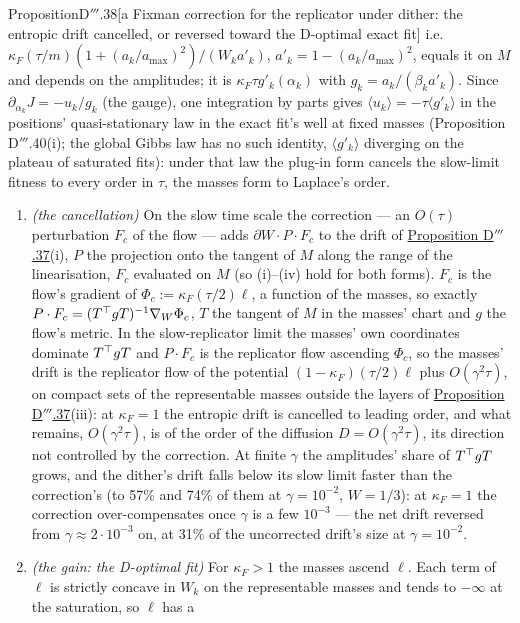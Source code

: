 \begin{thm}{Proposition}{D$'''$.38}[a Fixman correction for the replicator under dither: the entropic drift cancelled,
or reversed toward the D-optimal exact fit]
i.e.\ $\kappa_F(\tau/m)(1 + (a_k/a_{\max})^2)/(W_ka'_k)$, $a'_k = 1 - (a_k/a_{\max})^2$, equals it on $M$ and depends on
the amplitudes; it is $\kappa_F\tau g'_k(\alpha_k)$ with $g_k = a_k/(\beta_ka'_k)$. Since
$\partial_{\alpha_k}J = -u_k/g_k$ (the gauge), one integration by parts gives
$\langle u_k\rangle = -\tau\langle g'_k\rangle$ in the positions' quasi-stationary law in the exact fit's well at fixed
masses (Proposition D$'''$.40(i); the global Gibbs law has no such identity, $\langle g'_k\rangle$ diverging on the
plateau of saturated fits): under that law the plug-in form cancels the slow-limit fitness to every order in $\tau$,
the masses form to Laplace's order.
\begin{enumerate}[label=\textup{(\roman*)}]
  \item \emph{(the cancellation)} On the slow time scale the correction --- an $O(\tau)$ perturbation $F_c$ of the
    flow --- adds $\partial W\cdot P\cdot F_c$ to the drift of \hyperref[res:thmDppp:37]{Proposition D$'''$.37}(i),
    $P$ the projection onto the tangent of $M$ along the range of the linearisation, $F_c$ evaluated on $M$ (so
    (i)--(iv) hold for both forms). $F_c$ is the flow's gradient of $\Phi_c := \kappa_F(\tau/2)\ell$, a function of the
    masses, so exactly $P\cdot F_c = (T^\top gT)^{-1}\nabla_W\Phi_c$, $T$ the tangent of $M$ in the masses' chart and $g$
    the flow's metric. In the slow-replicator limit the masses' own coordinates dominate $T^\top gT$ and $P\cdot F_c$ is
    the replicator flow ascending $\Phi_c$, so the masses' drift is the replicator flow of the potential
    $(1 - \kappa_F)(\tau/2)\ell$ plus $O(\gamma^2\tau)$, on compact sets of the representable masses outside the layers
    of \hyperref[res:thmDppp:37]{Proposition D$'''$.37}(iii): at $\kappa_F = 1$ the entropic drift is cancelled to
    leading order, and what remains, $O(\gamma^2\tau)$, is of the order of the diffusion $D = O(\gamma^2\tau)$, its
    direction not controlled by the correction. At finite $\gamma$ the amplitudes' share of $T^\top gT$ grows, and the
    dither's drift falls below its slow limit faster than the correction's (to 57\% and 74\% of them at
    $\gamma = 10^{-2}$, $W = 1/3$): at $\kappa_F = 1$ the correction over-compensates once $\gamma$ is a few
    $10^{-3}$ --- the net drift reversed from $\gamma\approx2\cdot10^{-3}$ on, at 31\% of the uncorrected drift's size
    at $\gamma = 10^{-2}$.
  \item \emph{(the gain: the D-optimal fit)} For $\kappa_F > 1$ the masses ascend $\ell$. Each term of $\ell$ is
    strictly concave in $W_k$ on the representable masses and tends to $-\infty$ at the saturation, so $\ell$ has a

\end{enumerate}
\end{thm}
